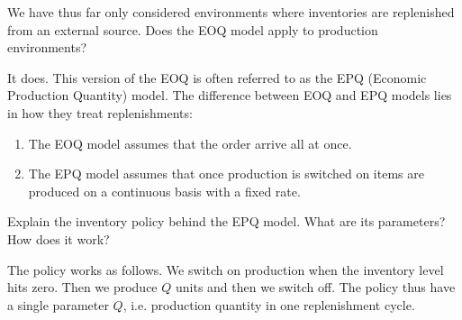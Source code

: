 \begin{exercise}
We have thus far only considered environments where inventories are replenished from an external source. Does the EOQ model apply to production environments?


\begin{solution}
It does. This version of the EOQ is often referred to as the EPQ (Economic Production Quantity) model. The difference between EOQ and EPQ models lies in how they treat replenishments:
\begin{enumerate}
\item The EOQ model assumes that the order arrive all at once.
\item The EPQ model assumes that once production is switched on items are produced on a continuous basis with a fixed rate.
\end{enumerate}
\end{solution}
\end{exercise}

\begin{exercise}
Explain the inventory policy behind the EPQ model. What are its parameters? How does it work?


\begin{solution}
The policy works as follows. We switch on production when the inventory level hits zero. Then we produce $Q$ units and then we switch off. The policy thus have a single parameter $Q$, i.e. production quantity in one replenishment cycle. 
\end{solution}
\end{exercise}

